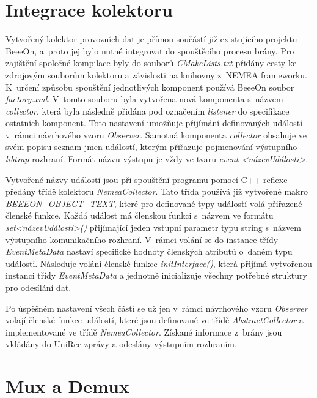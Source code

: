 
\section{Integrace kolektoru}    
     Vytvořený kolektor provozních dat je přímou součástí již existujícího projektu BeeeOn, a~proto jej bylo nutné 
     integrovat do spouštěcího procesu brány. Pro zajištění společné kompilace byly do souborů 
     \textit{CMakeLists.txt} přidány cesty ke zdrojovým souborům kolektoru a závislosti na knihovny
     z~NEMEA frameworku. K~určení způsobu spouštění jednotlivých komponent používá BeeeOn
     soubor \textit{factory.xml}. V~tomto souboru byla vytvořena nová komponenta s~názvem 
     \textit{collector}, 
     která byla následně přidána pod označením \textit{listener} do specifikace ostatních komponent.
     Toto nastavení 
     umožňuje přijímání definovaných událostí v~rámci návrhového vzoru \textit{Observer}.
     Samotná komponenta \textit{collector}
     obsahuje ve svém popisu seznam jmen událostí, kterým přiřazuje pojmenování výstupního \textit{libtrap}
     rozhraní. Formát názvu výstupu je vždy ve tvaru \textit{event-<názevUdálosti>}. 
     
     Vytvořené názvy událostí jsou při spouštění programu pomocí C++ reflexe předány třídě kolektoru
     \textit{NemeaCollector}. Tato třída používá již vytvořené makro \textit{BEEEON\_OBJECT\_TEXT},
     které pro definované 
     typy událostí volá přiřazené členské funkce. Každá událost má členskou funkci s~názvem ve formátu 
     \textit{set<názevUdálosti>()} přijímající jeden vstupní parametr typu string s~názvem výstupního 
     komunikačního rozhraní. V~rámci volání se do instance třídy \textit{EventMetaData}
     nastaví specifické hodnoty členských
     atributů o~daném typu události. Následuje volání členské funkce \textit{initInterface()},
     která přijímá vytvořenou instanci třídy  \textit{EventMetaData} a
     jednotně inicializuje všechny potřebné struktury pro odesílání dat.
     
     Po úspěšném nastavení všech částí se už jen v~rámci návrhového vzoru \textit{Observer} volají
     členské funkce událostí, které jsou definované ve třídě \textit{AbstractCollector} a implementované
     ve třídě \textit{NemeaCollector}. Získané informace z~brány jsou vkládány do UniRec zprávy a odeslány
     výstupním rozhraním.
     
\section{Mux a Demux}    

